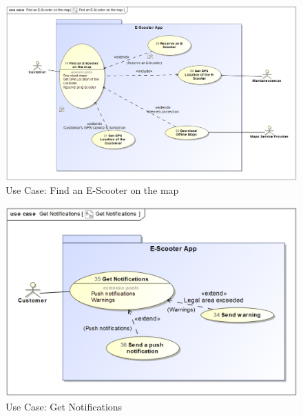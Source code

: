 \documentclass[a4paper, 12pt]{article}
\begin{document}
\begin{figure} [htbp]
  \begin{center}
    \includegraphics[scale=0.6]{images/UseCases/FindE-ScooterOnTheMap.png}
  \end{center}
  \caption{Use Case: Find an E-Scooter on the map}
\end{figure}

\begin{figure} [htbp]
  \begin{center}
    \includegraphics[scale=0.6]{images/UseCases/GetNotifications.png}
  \end{center}
  \caption{Use Case: Get Notifications}
\end{figure}
\end{document}
